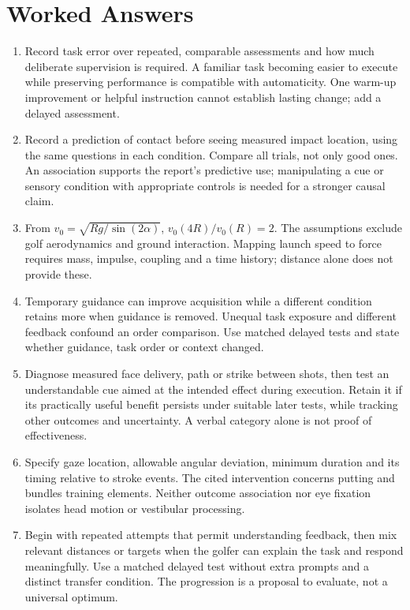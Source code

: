 \section{Worked Answers}
\begin{enumerate}
\item Record task error over repeated, comparable assessments and how much deliberate supervision is required. A familiar task becoming easier to execute while preserving performance is compatible with automaticity. One warm-up improvement or helpful instruction cannot establish lasting change; add a delayed assessment.
\item Record a prediction of contact before seeing measured impact location, using the same questions in each condition. Compare all trials, not only good ones. An association supports the report's predictive use; manipulating a cue or sensory condition with appropriate controls is needed for a stronger causal claim.
\item From $v_0=\sqrt{Rg/\sin(2\alpha)}$, $v_0(4R)/v_0(R)=2$. The assumptions exclude golf aerodynamics and ground interaction. Mapping launch speed to force requires mass, impulse, coupling and a time history; distance alone does not provide these.
\item Temporary guidance can improve acquisition while a different condition retains more when guidance is removed. Unequal task exposure and different feedback confound an order comparison. Use matched delayed tests and state whether guidance, task order or context changed.
\item Diagnose measured face delivery, path or strike between shots, then test an understandable cue aimed at the intended effect during execution. Retain it if its practically useful benefit persists under suitable later tests, while tracking other outcomes and uncertainty. A verbal category alone is not proof of effectiveness.
\item Specify gaze location, allowable angular deviation, minimum duration and its timing relative to stroke events. The cited intervention concerns putting and bundles training elements. Neither outcome association nor eye fixation isolates head motion or vestibular processing.
\item Begin with repeated attempts that permit understanding feedback, then mix relevant distances or targets when the golfer can explain the task and respond meaningfully. Use a matched delayed test without extra prompts and a distinct transfer condition. The progression is a proposal to evaluate, not a universal optimum.

\end{enumerate}
